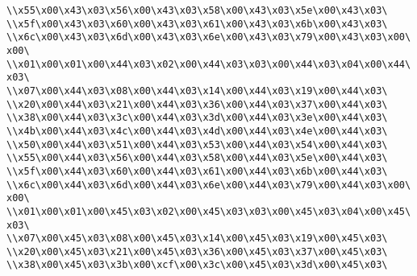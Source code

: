 \verb|\\x55\x00\x43\x03\x56\x00\x43\x03\x58\x00\x43\x03\x5e\x00\x43\x03\|\newline
\verb|\\x5f\x00\x43\x03\x60\x00\x43\x03\x61\x00\x43\x03\x6b\x00\x43\x03\|\newline
\verb|\\x6c\x00\x43\x03\x6d\x00\x43\x03\x6e\x00\x43\x03\x79\x00\x43\x03\x00\x00\|\newline
\verb|\\x01\x00\x01\x00\x44\x03\x02\x00\x44\x03\x03\x00\x44\x03\x04\x00\x44\x03\|\newline
\verb|\\x07\x00\x44\x03\x08\x00\x44\x03\x14\x00\x44\x03\x19\x00\x44\x03\|\newline
\verb|\\x20\x00\x44\x03\x21\x00\x44\x03\x36\x00\x44\x03\x37\x00\x44\x03\|\newline
\verb|\\x38\x00\x44\x03\x3c\x00\x44\x03\x3d\x00\x44\x03\x3e\x00\x44\x03\|\newline
\verb|\\x4b\x00\x44\x03\x4c\x00\x44\x03\x4d\x00\x44\x03\x4e\x00\x44\x03\|\newline
\verb|\\x50\x00\x44\x03\x51\x00\x44\x03\x53\x00\x44\x03\x54\x00\x44\x03\|\newline
\verb|\\x55\x00\x44\x03\x56\x00\x44\x03\x58\x00\x44\x03\x5e\x00\x44\x03\|\newline
\verb|\\x5f\x00\x44\x03\x60\x00\x44\x03\x61\x00\x44\x03\x6b\x00\x44\x03\|\newline
\verb|\\x6c\x00\x44\x03\x6d\x00\x44\x03\x6e\x00\x44\x03\x79\x00\x44\x03\x00\x00\|\newline
\verb|\\x01\x00\x01\x00\x45\x03\x02\x00\x45\x03\x03\x00\x45\x03\x04\x00\x45\x03\|\newline
\verb|\\x07\x00\x45\x03\x08\x00\x45\x03\x14\x00\x45\x03\x19\x00\x45\x03\|\newline
\verb|\\x20\x00\x45\x03\x21\x00\x45\x03\x36\x00\x45\x03\x37\x00\x45\x03\|\newline
\verb|\\x38\x00\x45\x03\x3b\x00\xcf\x00\x3c\x00\x45\x03\x3d\x00\x45\x03\|\newline
